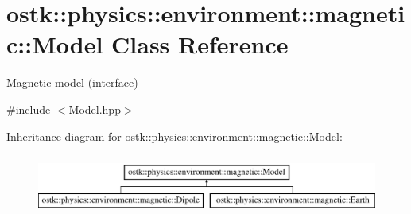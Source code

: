 \hypertarget{classostk_1_1physics_1_1environment_1_1magnetic_1_1_model}{}\section{ostk\+:\+:physics\+:\+:environment\+:\+:magnetic\+:\+:Model Class Reference}
\label{classostk_1_1physics_1_1environment_1_1magnetic_1_1_model}


Magnetic model (interface)  




{\ttfamily \#include $<$Model.\+hpp$>$}

Inheritance diagram for ostk\+:\+:physics\+:\+:environment\+:\+:magnetic\+:\+:Model\+:\begin{figure}[H]
\begin{center}
\leavevmode
\includegraphics[height=2.000000cm]{classostk_1_1physics_1_1environment_1_1magnetic_1_1_model}
\end{center}
\end{figure}
